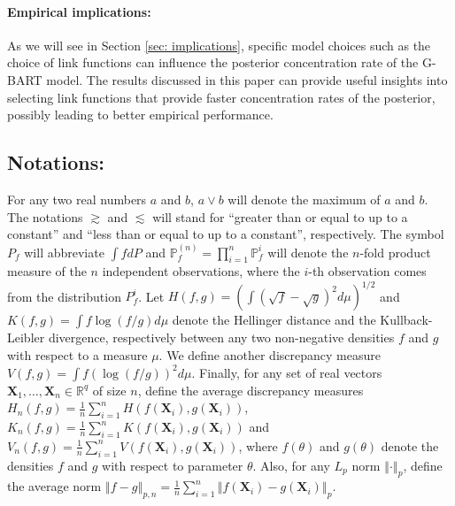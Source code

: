 \documentclass[12pt]{article}
\newcommand{\bm}[1]{\boldsymbol{#1}}
\renewcommand{\P}{\mathbb{P}}
\newcommand{\norm}[1]{\left\Vert#1\right\Vert}
\newcommand{\1}{\mathbb{I}}
\def\X{\bm{X}}
\renewcommand{\P}{\mathbb{P}}
\def\X{\mbox{\boldmath$X$}}
\def\X{\bm{X}}
\theoremstyle{plain}
\theoremstyle{definition}
\theoremstyle{remark}
\begin{document}
\paragraph{Empirical implications:} As we will see in Section \ref{sec: implications}, specific model choices such as the choice of link functions can influence the posterior concentration rate of the G-BART model. The results discussed in this paper can provide useful insights into selecting link functions that provide faster concentration rates of the posterior, possibly leading to better empirical performance.
\fi


\subsection{Notations:}
For any two real numbers $a$ and $b$, $a \vee b$ will denote the maximum of $a$ and $b$. The notations $\gtrsim$ and $\lesssim$ will stand for ``greater than or equal to up to a constant'' and ``less than or equal to up to a constant'', respectively. The symbol $P_f$ will abbreviate $\int f dP$ and $\P_{f}^{(n)} = \prod_{i=1}^n \P_{f}^i$ will denote the $n$-fold product measure of the $n$ independent observations, where the $i$-th observation comes from the distribution $P_{f}^i$. Let $H(f,g) = \left (\int (\sqrt{f}-\sqrt{g})^2 d\mu \right )^{1/2}$ and $K(f,g) = \int f \log (f/g) d\mu$ denote the Hellinger distance and the Kullback-Leibler divergence, respectively between any two non-negative densities $f$ and $g$ with respect to a measure $\mu$. We define another discrepancy measure $V(f,g) = \int f \left(\log (f/g)\right)^2 d\mu$. Finally, for any set of real vectors $\X_1, \dots, \X_n \in \mathbb{R}^q$ of size $n$, define the average discrepancy measures $H_n(f,g) = \frac{1}{n}\sum_{i=1}^n H\left(f(\X_i), g(\X_i) \right)$, $K_n(f,g) = \frac{1}{n}\sum_{i=1}^n K\left(f(\X_i), g(\X_i) \right)$ and $V_n(f,g) = \frac{1}{n}\sum_{i=1}^n V\left(f(\X_i), g(\X_i) \right)$, where $f(\theta)$ and $g(\theta)$ denote the densities $f$ and $g$ with respect to parameter $\theta$. Also, for any $L_p$ norm $\norm{\cdot}_p$, define the average norm $\norm{f-g}_{p,n} = \frac{1}{n} \sum_{i=1}^n \norm{f(\X_i)-g(\X_i)}_p$.
\end{document}
